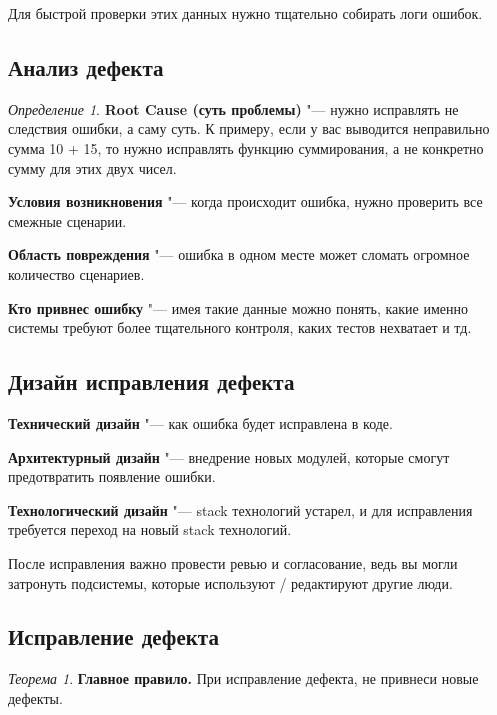 \documentclass[bachelor, och, pract]{SCWorks}
\theoremstyle{remark}
\newtheorem{theorem}{Теорема}
\newtheorem{definition}{Определение}
\newtheorem{comment}{Замечание}
\begin{document}
    
    Для быстрой проверки этих данных нужно тщательно собирать логи ошибок.

    \subsection{Анализ дефекта}

    \begin{definition}
        \textbf{Root Cause (суть проблемы)} "--- нужно исправлять не следствия ошибки, а саму суть. К примеру, если у вас выводится неправильно сумма 10 + 15, то нужно исправлять функцию суммирования, а не конкретно сумму для этих двух чисел. 
    \end{definition}

    \textbf{Условия возникновения} "--- когда происходит ошибка, нужно проверить все смежные сценарии.
    
    \textbf{Область повреждения} "--- ошибка в одном месте может сломать огромное количество сценариев.

    \textbf{Кто привнес ошибку} "--- имея такие данные можно понять, какие именно системы требуют более тщательного контроля, каких тестов нехватает и тд.

    \subsection{Дизайн исправления дефекта}
    \textbf{Технический дизайн} "--- как ошибка будет исправлена в коде.
    
    \textbf{Архитектурный дизайн} "--- внедрение новых модулей, которые смогут предотвратить появление ошибки.
    
    \textbf{Технологический дизайн} "--- stack технологий устарел, и для исправления требуется переход на новый stack технологий.

    После исправления важно провести ревью и согласование, ведь вы могли затронуть подсистемы, которые используют / редактируют другие люди.

    \subsection{Исправление дефекта}
    \begin{theorem}
        \textbf{Главное правило.} При исправление дефекта, не привнеси новые дефекты.
    \end{theorem}
    
\end{document}
